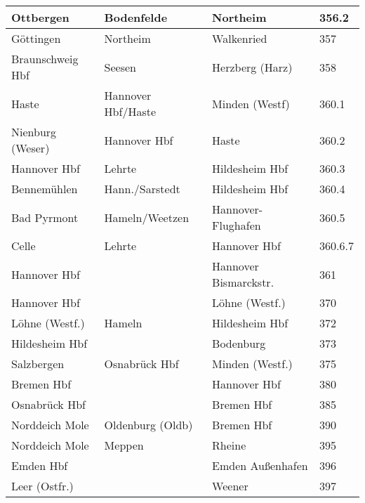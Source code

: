 \begin{tabular}{|l|l|l|p{2cm}|}
Ottbergen & Bodenfelde & Northeim & 356.2 \\ \hline
Göttingen & Northeim & Walkenried & 357 \footnotemark[1] \\ \hline
Braunschweig Hbf & Seesen & Herzberg (Harz) & 358 \\ \hline
Haste & Hannover Hbf/Haste & Minden (Westf) & 360.1 \\ \hline
Nienburg (Weser) & Hannover Hbf & Haste & 360.2 \\ \hline
Hannover Hbf & Lehrte & Hildesheim Hbf & 360.3 \\ \hline
Bennemühlen & Hann./Sarstedt & Hildesheim Hbf & 360.4 \\ \hline
Bad Pyrmont & Hameln/Weetzen & Hannover-Flughafen & 360.5 \\ \hline
Celle & Lehrte & Hannover Hbf & 360.6.7 \\ \hline
Hannover Hbf &  & Hannover Bismarckstr. & 361 \footnotemark[1] \\ \hline
Hannover Hbf &  & Löhne (Westf.) & 370 \\ \hline
Löhne (Westf.) & Hameln & Hildesheim Hbf & 372 \\ \hline
Hildesheim Hbf &  & Bodenburg & 373 \\ \hline
Salzbergen & Osnabrück Hbf & Minden (Westf.) & 375 \footnotemark[1] \\ \hline
Bremen Hbf &  & Hannover Hbf & 380 \\ \hline
Osnabrück Hbf &  & Bremen Hbf & 385 \footnotemark[1] \\ \hline
Norddeich Mole & Oldenburg (Oldb) & Bremen Hbf & 390 \footnotemark[1] \\ \hline
Norddeich Mole & Meppen & Rheine & 395 \footnotemark[1] \\ \hline
Emden Hbf &  & Emden Außenhafen & 396 \\ \hline
Leer (Ostfr.) &  & Weener & 397 \\ \hline
\end{tabular}

\label{streckenliste1}

